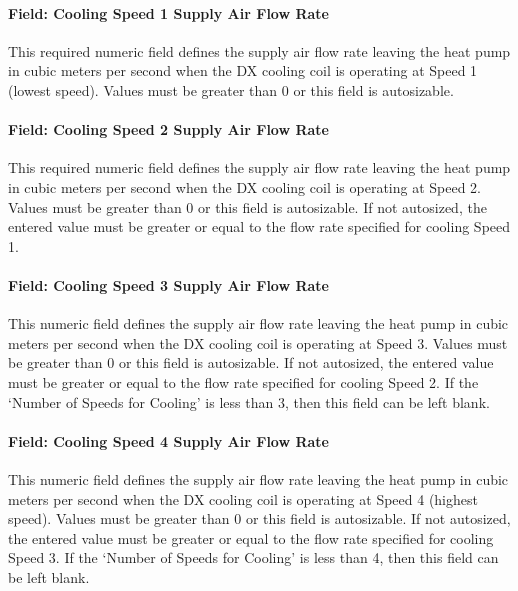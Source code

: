 \paragraph{Field: Cooling Speed 1 Supply Air Flow Rate}\label{field-cooling-speed-1-supply-air-flow-rate}

This required numeric field defines the supply air flow rate leaving the heat pump in cubic meters per second when the DX cooling coil is operating at Speed 1 (lowest speed). Values must be greater than 0 or this field is autosizable.

\paragraph{Field: Cooling Speed 2 Supply Air Flow Rate}\label{field-cooling-speed-2-supply-air-flow-rate}

This required numeric field defines the supply air flow rate leaving the heat pump in cubic meters per second when the DX cooling coil is operating at Speed 2. Values must be greater than 0 or this field is autosizable. If not autosized, the entered value must be greater or equal to the flow rate specified for cooling Speed 1.

\paragraph{Field: Cooling Speed 3 Supply Air Flow Rate}\label{field-cooling-speed-3-supply-air-flow-rate}

This numeric field defines the supply air flow rate leaving the heat pump in cubic meters per second when the DX cooling coil is operating at Speed 3. Values must be greater than 0 or this field is autosizable. If not autosized, the entered value must be greater or equal to the flow rate specified for cooling Speed 2. If the `Number of Speeds for Cooling' is less than 3, then this field can be left blank.

\paragraph{Field: Cooling Speed 4 Supply Air Flow Rate}\label{field-cooling-speed-4-supply-air-flow-rate}

This numeric field defines the supply air flow rate leaving the heat pump in cubic meters per second when the DX cooling coil is operating at Speed 4 (highest speed). Values must be greater than 0 or this field is autosizable. If not autosized, the entered value must be greater or equal to the flow rate specified for cooling Speed 3. If the `Number of Speeds for Cooling' is less than 4, then this field can be left blank.

